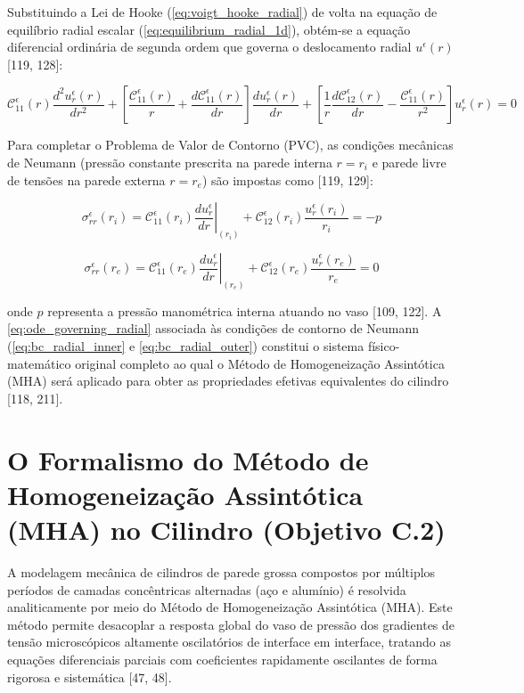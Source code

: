 Substituindo a Lei de Hooke (\eqref{eq:voigt_hooke_radial}) de volta na equação de equilíbrio radial escalar (\eqref{eq:equilibrium_radial_1d}), obtém-se a equação diferencial ordinária de segunda ordem que governa o deslocamento radial $u^\epsilon (r)$ [119, 128]:

\begin{equation}
  \mathcal{C}_{11}^\epsilon (r) \frac{d^2 u_r^\epsilon(r)}{d r^2} + \left[ \frac{\mathcal{C}_{11}^\epsilon (r)}{r} + \frac{d \mathcal{C}_{11}^\epsilon (r)}{d r} \right] \frac{d u_r^\epsilon(r)}{d r} + \left[ \frac{1}{r} \frac{d \mathcal{C}_{12}^\epsilon (r)}{d r} - \frac{\mathcal{C}_{11}^\epsilon (r)}{r^2} \right] u_r^\epsilon(r) = 0
  \label{eq:ode_governing_radial}
\end{equation}

Para completar o Problema de Valor de Contorno (PVC), as condições mecânicas de Neumann (pressão constante prescrita na parede interna $r = r_i$ e parede livre de tensões na parede externa $r = r_e$) são impostas como [119, 129]:

\begin{equation}
  \sigma_{rr}^\epsilon (r_i) = \mathcal{C}_{11}^\epsilon (r_i) \left. \frac{d u_r^\epsilon}{d r} \right|_{(r_i)} + \mathcal{C}_{12}^\epsilon (r_i) \frac{u_r^\epsilon (r_i)}{r_i} = -p
  \label{eq:bc_radial_inner}
\end{equation}

\begin{equation}
  \sigma_{rr}^\epsilon (r_e) = \mathcal{C}_{11}^\epsilon (r_e) \left. \frac{d u_r^\epsilon}{d r} \right|_{(r_e)} + \mathcal{C}_{12}^\epsilon (r_e) \frac{u_r^\epsilon (r_e)}{r_e} = 0
  \label{eq:bc_radial_outer}
\end{equation}

onde $p$ representa a pressão manométrica interna atuando no vaso [109, 122]. A \eqref{eq:ode_governing_radial} associada às condições de contorno de Neumann (\eqref{eq:bc_radial_inner} e \eqref{eq:bc_radial_outer}) constitui o sistema físico-matemático original completo ao qual o Método de Homogeneização Assintótica (MHA) será aplicado para obter as propriedades efetivas equivalentes do cilindro [118, 211].

\section{O Formalismo do Método de Homogeneização Assintótica (MHA) no Cilindro (Objetivo C.2)}

A modelagem mecânica de cilindros de parede grossa compostos por múltiplos períodos de camadas concêntricas alternadas (aço e alumínio) é resolvida analiticamente por meio do Método de Homogeneização Assintótica (MHA). Este método permite desacoplar a resposta global do vaso de pressão dos gradientes de tensão microscópicos altamente oscilatórios de interface em interface, tratando as equações diferenciais parciais com coeficientes rapidamente oscilantes de forma rigorosa e sistemática [47, 48].

